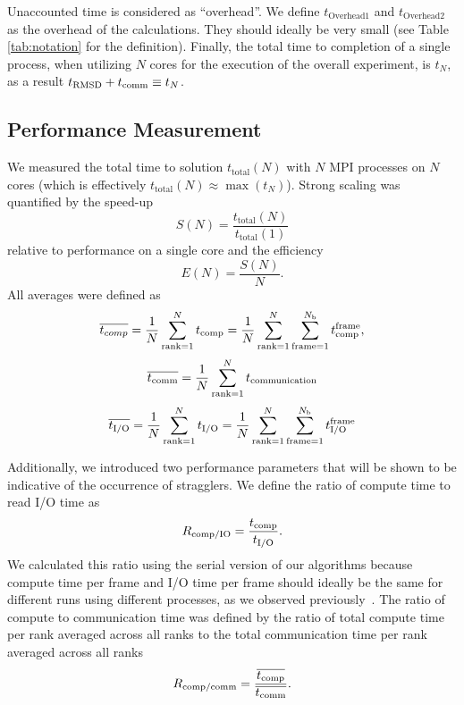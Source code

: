 Unaccounted time is considered as ``overhead''. We define
$t_{\text{Overhead1}}$ and $t_{\text{Overhead2}}$ as the overhead of the calculations. 
They should ideally be very small (see Table \ref{tab:notation} for the definition). 
Finally, the total time to completion of a single process, when utilizing $N$ cores for the execution of the overall experiment, is $t_{N}$, as a result $t_{\text{RMSD}} + t_{\text{comm}} \equiv t_{N}$.

\subsection{Performance Measurement}

We measured the total time to solution $t_{\text{total}}(N)$ with $N$ MPI processes on $N$ cores (which is effectively
$t_{\text{total}}(N) \approx \max(t_{N})$). 
Strong scaling was quantified by the speed-up
\begin{equation}
  \label{eq:speedup}
  S(N) = \frac{t_{\text{total}}(N)}{t_{\text{total}}(1)}
\end{equation}
relative to performance on a single core and the efficiency
\begin{equation}
  \label{eq:efficiency}
  E(N) = \frac{S(N)}{N}.
\end{equation}
All averages were defined as
\begin{equation}
\overline{t_{comp}} = \frac{1}{N}
\sum_{\text{rank}=1}^{N}{t}_{\text{comp}} = \frac{1}{N}\sum_{\text{rank}=1}^{N}\sum_{\text{frame}=1}^{N_\text{b}}{t}_{\text{comp}}^{\text{frame}},
\end{equation}
\begin{equation}
\overline{t_{\text{comm}}} = \frac{1}{N}\sum_{\text{rank}=1}^{N}t_{\text{communication}}
\end{equation}
\begin{equation}
\overline{{t}_{\text{I/O}}} = \frac{1}{N}\sum_{\text{rank}=1}^{N}{t}_{\text{I/O}} = \frac{1}{N}\sum_{\text{rank}=1}^{N}\sum_{\text{frame}=1}^{N_{\text{b}}}{t}_{\text{I/O}}^{\text{frame}}
\end{equation}

Additionally, we introduced two performance parameters that will be shown to be indicative of the occurrence of stragglers.
We define the ratio of compute time to read I/O time as
\begin{equation}
  R_{\text{comp/IO}} = \frac{{t}_{\text{comp}}}{{t}_{\text{I/O}}}.
  \label{eq:Compute-IO}
\end{equation}
We calculated this ratio using the serial version of our algorithms because compute time per frame and I/O time per frame should ideally be the same for different runs using different processes, as we observed previously~\cite{Khoshlessan:2017ab}.
The ratio of compute to communication time was defined by the ratio of total compute time per rank averaged across all ranks to the total communication time per rank averaged across all ranks 
\begin{equation}
  \label{eq:Compute-comm}
  R_{\text{comp/comm}} = \frac{\overline{{t}_{\text{comp}}}}{\overline{t_{\text{comm}}}}.
\end{equation}
 
